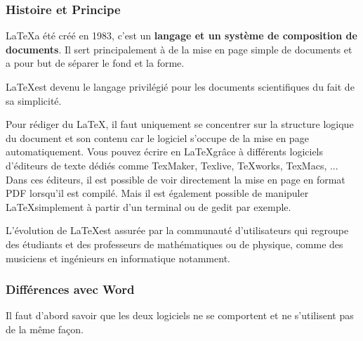 \subsubsection{Histoire et Principe}

\LaTeX  a été créé en 1983, c'est un \textbf{langage et un système de composition de documents}.
Il sert principalement à de la mise en page simple de documents et a pour but de
 séparer le fond et la forme.

\LaTeX  est devenu le langage privilégié pour les documents scientifiques du fait
 de sa simplicité.\newline

Pour rédiger du \LaTeX , il faut uniquement se concentrer sur la structure
logique du document et son contenu car le logiciel s'occupe de la mise en page
automatiquement.
Vous pouvez écrire en \LaTeX  grâce à différents logiciels d’éditeurs de texte
dédiés comme TexMaker, Texlive, TeXworks, TexMacs, ...
Dans ces éditeurs, il est possible de voir directement la mise en page en format
PDF lorsqu'il est compilé.
Mais il est également possible de manipuler \LaTeX  simplement à partir d'un
terminal ou de gedit par exemple.\newline

L'évolution de \LaTeX  est assurée par la communauté d'utilisateurs qui regroupe
des étudiants et des professeurs de mathématiques ou de physique, comme des
musiciens et ingénieurs en informatique notamment.


\subsubsection{Différences avec Word}

Il faut d'abord savoir que les deux logiciels ne se comportent et ne s'utilisent pas de la même façon.


